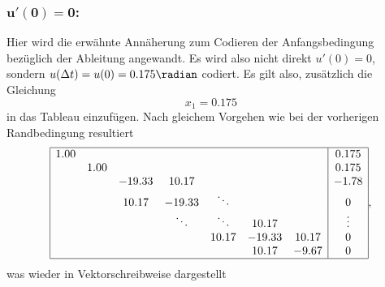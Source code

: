 \subsubsection{$\mathbf{u'(0) = 0 }$:}
Hier wird die erwähnte Annäherung zum Codieren der Anfangsbedingung bezüglich der Ableitung angewandt.
Es wird also nicht direkt $u'(0) = 0 $, sondern $u(\Delta t) = u(0) = 0.175 \radian$ codiert.
Es gilt also, zusätzlich die Gleichung
\begin{equation}
    x_1 = 0.175
\end{equation}
in das Tableau einzufügen.
Nach gleichem Vorgehen wie bei der vorherigen Randbedingung resultiert
\begin{equation}
    \begin{array}{|ccccccc|c|}
        \hline
         1.00  &        &        &        &        &        &        & 0.175  \\
               &  1.00  &        &        &        &        &        & 0.175  \\
               &        &-19.33  & 10.17  &        &        &        & -1.78  \\
               &        & 10.17  &-19.33  & \ddots &        &        & 0      \\
               &        &        & \ddots & \ddots & 10.17  &        & \vdots \\
               &        &        &        & 10.17  &-19.33  & 10.17  & 0      \\
               &        &        &        &        & 10.17  & -9.67  & 0      \\
        \hline
    \end{array},
\end{equation}
was wieder in Vektorschreibweise dargestellt
